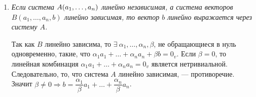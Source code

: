 \begin{enumerate}
	\newtheorem*{Cor4*}{Следствие} \begin{Cor4*} Система, содержащая равные векторы, всегда линейно зависима. \end{Cor4*}
	
	\item \textit{Если система $A(a_1,\dots,a_n)$ линейно независимая, а система векторов $B(a_1, \dots, a_n, b)$ линейно зависимая, то вектор $b$ линейно выражается через систему $A$.}
	
	\begin{Proof} Так как $B$ линейно зависима, то $\exists\ \alpha_1,\dots,\alpha_n,\beta$, не обращающиеся в нуль одновременно, такие, что $\alpha_1a_1 + \ldots + \alpha_n a_n + \beta b = 0_v$.
		Если $\beta = 0$, то линейная комбинация $\alpha_1a_1 + \ldots + \alpha_n a_n = 0_v$ является нетривиальной. Следовательно, то, что система $A$ линейно зависимая, --- противоречие. Значит $\beta \ne 0 \Rightarrow b = \dfrac{\alpha_1}{\beta}a_1 + \ldots + \dfrac{\alpha_n}{\beta}a_n$.
	\end{Proof}
\end{enumerate}












